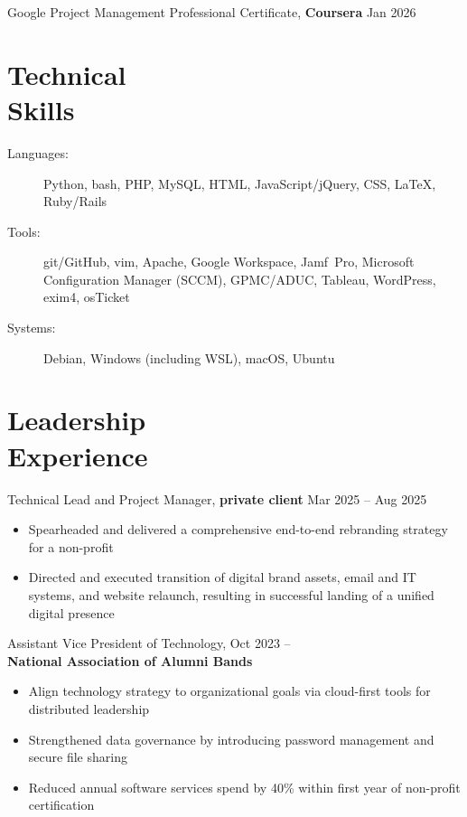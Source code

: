 \documentclass[11pt]{article}
\newcommand{\textdb}[1]{\fontseries{db}\selectfont#1\normalfont}
\newcommand{\present}{\phantom{Xxx 20XX}}
\newcommand{\itemizeonly}{\leavevmode\par\vspace{\dimexpr-\baselineskip-\parskip}}
\begin{document}
\textdb{
Google Project Management Professional Certificate,
\textbf{Coursera}
	\hfill Jan 2026
}


\section{Technical\\ Skills}

\itemizeonly
\begin{description}
	\item[\textdb{Languages:}] Python, bash, PHP, MySQL, HTML,
		JavaScript/jQuery, CSS, \LaTeX, Ruby/Rails
	\item[\textdb{Tools:}] git/GitHub, vim, Apache,
		Google Workspace,
		Jamf~Pro, Microsoft Configuration Manager (SCCM), GPMC/ADUC,
		Tableau, WordPress, exim4, osTicket
	\item[\textdb{Systems:}] Debian, Windows (including WSL), macOS, Ubuntu
\end{description}



\section{Leadership\\ Experience}

\textdb{
Technical Lead and Project Manager, \textbf{private client}
	\hfill Mar 2025 -- Aug 2025
}
\begin{itemize}
	\item Spearheaded and delivered a comprehensive
		end-to-end rebranding strategy for a non-profit
	\item Directed and executed transition of digital brand assets,
		email and IT systems, and website relaunch,
		resulting in successful landing of a unified digital presence
\end{itemize}

\textdb{
Assistant Vice President of Technology,
	\hfill Oct 2023 -- \present \\
}
\textbf{National Association of Alumni Bands}
\begin{itemize}
	\item Align technology strategy to organizational goals
		via cloud-first tools
		for distributed leadership
	\item Strengthened data governance by introducing
		password management and secure file sharing
	\item Reduced annual software services spend by 40\%
		within first year of non-profit certification
\end{itemize}
\end{document}

